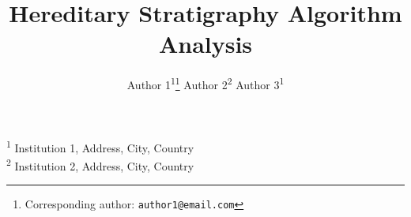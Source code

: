 \title{ Hereditary Stratigraphy Algorithm Analysis }
\author{
    Author 1\textsuperscript{1}\thanks{Corresponding author: \texttt{author1@email.com}} \quad
    Author 2\textsuperscript{2} \quad
    Author 3\textsuperscript{1}
}
\date{}

\newcommand{\affil}[1]{\textsuperscript{#1}}
\newcommand{\affiliations}{
    \affil{1} Institution 1, Address, City, Country \\
    \affil{2} Institution 2, Address, City, Country
}

\maketitle

\begin{center}
\affiliations
\end{center}


